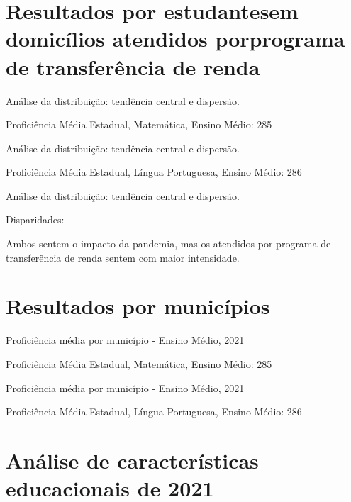 \documentclass[
  ignorenonframetext,
]{beamer}
\begin{document}
\hypertarget{resultados-por-estudantes-em-domicuxedlios-atendidos-por-programa-de-transferuxeancia-de-renda}{%
\section{\texorpdfstring{Resultados por estudantesem domicílios
atendidos porprograma de transferência de
renda}{Resultados por estudantes em domicílios atendidos por programa de transferência de renda}}\label{resultados-por-estudantes-em-domicuxedlios-atendidos-por-programa-de-transferuxeancia-de-renda}}

\begin{frame}
Análise da distribuição: tendência central e dispersão.

Proficiência Média Estadual, Matemática, Ensino Médio: 285
\end{frame}

\begin{frame}
Análise da distribuição: tendência central e dispersão.

Proficiência Média Estadual, Língua Portuguesa, Ensino Médio: 286
\end{frame}

\begin{frame}
Análise da distribuição: tendência central e dispersão.

Disparidades:

Ambos sentem o impacto da pandemia, mas os atendidos por programa de
transferência de renda sentem com maior intensidade.
\end{frame}

\hypertarget{resultados-por-municuxedpios}{%
\section{Resultados por municípios}\label{resultados-por-municuxedpios}}

\begin{frame}
Proficiência média por município - Ensino Médio, 2021

Proficiência Média Estadual, Matemática, Ensino Médio: 285
\end{frame}

\begin{frame}
Proficiência média por município - Ensino Médio, 2021

Proficiência Média Estadual, Língua Portuguesa, Ensino Médio: 286
\end{frame}

\hypertarget{anuxe1lise-de-caracteruxedsticas-educacionais-de-2021}{%
\section{Análise de características educacionais de
2021}\label{anuxe1lise-de-caracteruxedsticas-educacionais-de-2021}}
\end{document}
